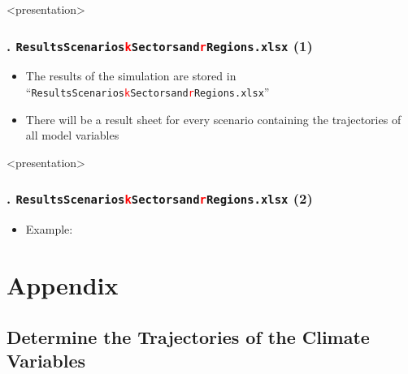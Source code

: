 \documentclass[11pt,aspectratio=169]{beamer}
\begin{document}
\begin{frame}<presentation>
	\frametitle{{\thesection.\thesubsection} \texttt{ResultsScenarios\textcolor{red}{k}Sectorsand\textcolor{red}{r}Regions.xlsx} (1)}
	\begin{itemize}
		\item The results of the simulation are stored in ``\texttt{ResultsScenarios\textcolor{red}{k}Sectorsand\textcolor{red}{r}Regions.xlsx}''
		\item There will be a result sheet for every scenario containing the trajectories of all model variables
	\end{itemize}
\end{frame}
\begin{frame}<presentation>
	\frametitle{{\thesection.\thesubsection} \texttt{ResultsScenarios\textcolor{red}{k}Sectorsand\textcolor{red}{r}Regions.xlsx} (2)}
	\begin{itemize}
		\item Example:
		\begin{figure}
		\end{figure}
	\end{itemize}
\end{frame}

\section{Appendix}

\subsection{Determine the Trajectories of the Climate Variables}
\end{document}
